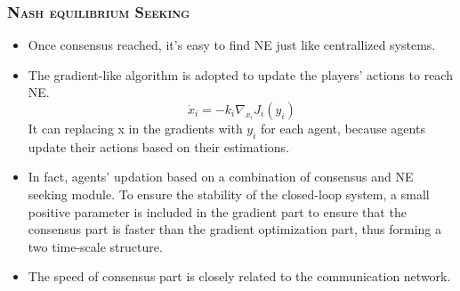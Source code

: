 \begin{frame}
  \frametitle{\normalsize\textsc{Nash equilibrium Seeking}}\transwipe
  
  \begin{itemize}
    \item Once consensus reached, it's easy to find NE just like centrallized systems.
    \item The gradient-like algorithm is adopted to update the players’ actions to reach NE.
     \begin{equation}
      \dot{x}_i  =-k_i \nabla_{x_i} J_i\left(y_i\right)
    \end{equation}
     It can replacing x in the gradients with $y_i$ for each agent, because agents update their actions based on their estimations.
    
     \item In fact,  agents' updation based on a combination of consensus and NE seeking module. To ensure the stability of the closed-loop system, a small positive parameter is included in the gradient part to ensure that the consensus part is faster than the gradient optimization part, thus forming a \textcolor[rgb]{0.00,0.00,1.00}{two time-scale structure}.
     
     \item The speed of consensus part is closely related to the communication network.
  \end{itemize}

  \end{frame}


